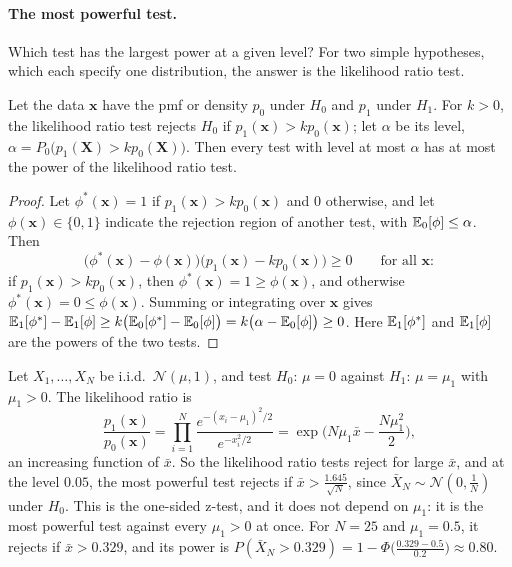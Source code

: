 \paragraph{The most powerful test.} Which test has the largest power at a given level? For two simple hypotheses, which each specify one distribution, the answer is the likelihood ratio test.

\begin{theorem}\label{L4-thm:neyman-pearson}
    Let the data $\mathbf{x}$ have the pmf or density $p_0$ under $H_0$ and $p_1$ under $H_1$. For $k > 0$, the likelihood ratio test rejects $H_0$ if $p_1(\mathbf{x}) > kp_0(\mathbf{x})$; let $\alpha$ be its level, $\alpha = P_0\big(p_1(\mathbf{X}) > kp_0(\mathbf{X})\big)$. Then every test with level at most $\alpha$ has at most the power of the likelihood ratio test.
\end{theorem}

\begin{proof}
    Let $\phi^*(\mathbf{x}) = 1$ if $p_1(\mathbf{x}) > kp_0(\mathbf{x})$ and $0$ otherwise, and let $\phi(\mathbf{x}) \in \{0, 1\}$ indicate the rejection region of another test, with $\mathbb{E}_0[\phi] \leq \alpha$. Then
    \[\big(\phi^*(\mathbf{x}) - \phi(\mathbf{x})\big)\big(p_1(\mathbf{x}) - kp_0(\mathbf{x})\big) \geq 0 \qquad \text{for all } \mathbf{x}:\]
    if $p_1(\mathbf{x}) > kp_0(\mathbf{x})$, then $\phi^*(\mathbf{x}) = 1 \geq \phi(\mathbf{x})$, and otherwise $\phi^*(\mathbf{x}) = 0 \leq \phi(\mathbf{x})$. Summing or integrating over $\mathbf{x}$ gives $\mathbb{E}_1[\phi^*] - \mathbb{E}_1[\phi] \geq k\big(\mathbb{E}_0[\phi^*] - \mathbb{E}_0[\phi]\big) = k\big(\alpha - \mathbb{E}_0[\phi]\big) \geq 0$. Here $\mathbb{E}_1[\phi^*]$ and $\mathbb{E}_1[\phi]$ are the powers of the two tests.
\end{proof}

\begin{example}\label{L4-ex:neyman-pearson}
    Let $X_1, \ldots, X_N$ be i.i.d.\ $\mathcal{N}(\mu, 1)$, and test $H_0$: $\mu = 0$ against $H_1$: $\mu = \mu_1$ with $\mu_1 > 0$. The likelihood ratio is
    \[\frac{p_1(\mathbf{x})}{p_0(\mathbf{x})} = \prod_{i=1}^N \frac{e^{-(x_i - \mu_1)^2/2}}{e^{-x_i^2/2}} = \exp\Big(N\mu_1\bar x - \frac{N\mu_1^2}{2}\Big),\]
    an increasing function of $\bar x$. So the likelihood ratio tests reject for large $\bar x$, and at the level $0.05$, the most powerful test rejects if $\bar x > \frac{1.645}{\sqrt{N}}$, since $\bar X_N \sim \mathcal{N}(0, \frac{1}{N})$ under $H_0$. This is the one-sided z-test, and it does not depend on $\mu_1$: it is the most powerful test against every $\mu_1 > 0$ at once. For $N = 25$ and $\mu_1 = 0.5$, it rejects if $\bar x > 0.329$, and its power is $P(\bar X_N > 0.329) = 1 - \Phi\big(\frac{0.329 - 0.5}{0.2}\big) \approx 0.80$.
\end{example}

